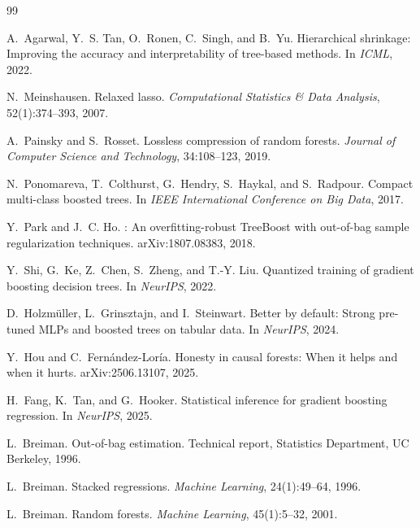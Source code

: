 \documentclass[11pt,a4paper]{article}
\theoremstyle{definition}
\begin{document}
\begin{thebibliography}{99}
\small

A.~Agarwal, Y.~S. Tan, O.~Ronen, C.~Singh, and B.~Yu.
\newblock Hierarchical shrinkage: Improving the accuracy and interpretability
of tree-based methods.
\newblock In \emph{ICML}, 2022.

N.~Meinshausen.
\newblock Relaxed lasso.
\newblock \emph{Computational Statistics \& Data Analysis}, 52(1):374--393, 2007.

A.~Painsky and S.~Rosset.
\newblock Lossless compression of random forests.
\newblock \emph{Journal of Computer Science and Technology}, 34:108--123, 2019.

N.~Ponomareva, T.~Colthurst, G.~Hendry, S.~Haykal, and S.~Radpour.
\newblock Compact multi-class boosted trees.
\newblock In \emph{IEEE International Conference on Big Data}, 2017.

Y.~Park and J.~C. Ho.
: An overfitting-robust {TreeBoost} with out-of-bag sample
regularization techniques.
\newblock arXiv:1807.08383, 2018.

Y.~Shi, G.~Ke, Z.~Chen, S.~Zheng, and T.-Y. Liu.
\newblock Quantized training of gradient boosting decision trees.
\newblock In \emph{NeurIPS}, 2022.

D.~Holzm\"uller, L.~Grinsztajn, and I.~Steinwart.
\newblock Better by default: Strong pre-tuned {MLPs} and boosted trees on
tabular data.
\newblock In \emph{NeurIPS}, 2024.

Y.~Hou and C.~Fern\'andez-Lor\'ia.
\newblock Honesty in causal forests: When it helps and when it hurts.
\newblock arXiv:2506.13107, 2025.

H.~Fang, K.~Tan, and G.~Hooker.
\newblock Statistical inference for gradient boosting regression.
\newblock In \emph{NeurIPS}, 2025.

L.~Breiman.
\newblock Out-of-bag estimation.
\newblock Technical report, Statistics Department, UC Berkeley, 1996.

L.~Breiman.
\newblock Stacked regressions.
\newblock \emph{Machine Learning}, 24(1):49--64, 1996.

L.~Breiman.
\newblock Random forests.
\newblock \emph{Machine Learning}, 45(1):5--32, 2001.


\end{thebibliography}
\end{document}
